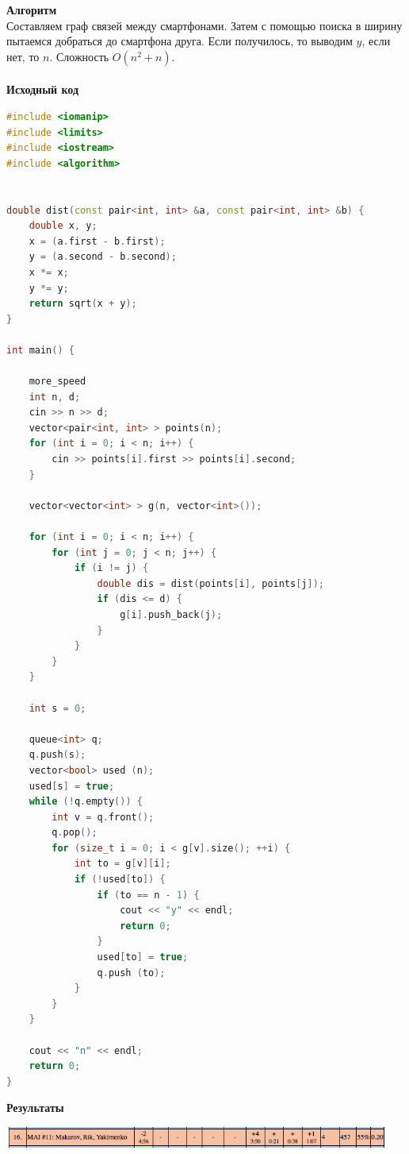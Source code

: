 \documentclass[a4paper,12pt]{article}
\begin{document}
\textbf{{\large Алгоритм}} \\
Составляем граф связей между смартфонами. Затем с помощью поиска в ширину пытаемся добраться до смартфона друга. Если получилось, то выводим $y$, если нет, то $n$. Сложность $O(n^2+n)$. \\ 
\\
\textbf{{\large Исходный код}}
\begin{lstlisting}[language=C++]
#include <iomanip>
#include <limits>
#include <iostream>
#include <algorithm>


double dist(const pair<int, int> &a, const pair<int, int> &b) {
    double x, y;
    x = (a.first - b.first);
    y = (a.second - b.second);
    x *= x;
    y *= y;
    return sqrt(x + y);
}

int main() {

    more_speed
    int n, d;
    cin >> n >> d;
    vector<pair<int, int> > points(n);
    for (int i = 0; i < n; i++) {
        cin >> points[i].first >> points[i].second;
    }

    vector<vector<int> > g(n, vector<int>());

    for (int i = 0; i < n; i++) {
        for (int j = 0; j < n; j++) {
            if (i != j) {
                double dis = dist(points[i], points[j]);
                if (dis <= d) {
                    g[i].push_back(j);
                }
            }
        }
    }

    int s = 0;

    queue<int> q;
    q.push(s);
    vector<bool> used (n);
    used[s] = true;
    while (!q.empty()) {
        int v = q.front();
        q.pop();
        for (size_t i = 0; i < g[v].size(); ++i) {
            int to = g[v][i];
            if (!used[to]) {
                if (to == n - 1) {
                    cout << "y" << endl;
                    return 0;
                }
                used[to] = true;
                q.push (to);
            }
        }
    }

    cout << "n" << endl;
    return 0;
}
\end{lstlisting}

\textbf{{\large Результаты}} \\
\begin{center}
\includegraphics[width=0.95\textwidth]{OC_Japan/OC_Japan_result.png}\\ [1cm]
\end{center}
\end{document}
